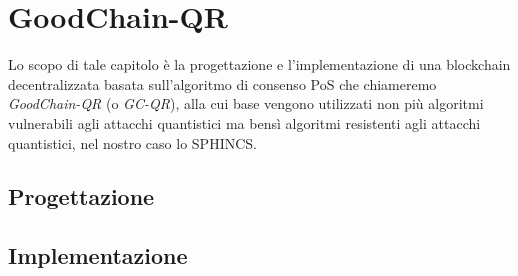 \chapter{GoodChain-QR}
Lo scopo di tale capitolo è la progettazione e l'implementazione di una blockchain decentralizzata basata sull'algoritmo di consenso PoS che chiameremo \textit{GoodChain-QR} (o \textit{GC-QR}), alla cui base vengono utilizzati non più algoritmi vulnerabili agli attacchi quantistici ma bensì algoritmi resistenti agli attacchi quantistici, nel nostro caso lo SPHINCS.

\section{Progettazione}


\section{Implementazione}
